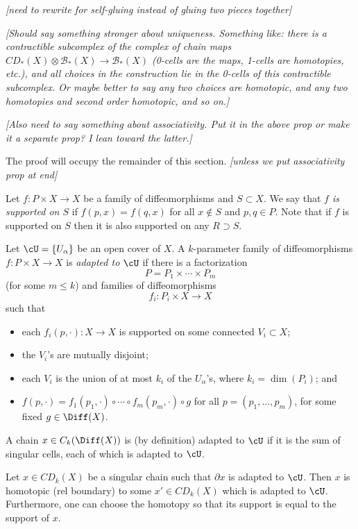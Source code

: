 \documentclass[11pt,leqno]{amsart}
\def\bc{{\mathcal B}}
\def\bd{\partial}
\def\sub{\subset}
\def\sup{\supset}
\def\nn#1{{{\it \small [#1]}}}
\newcommand{\eq}[1]{\begin{displaymath}#1\end{displaymath}}
\begin{document}
\nn{need to rewrite for self-gluing instead of gluing two pieces together}

\nn{Should say something stronger about uniqueness.
Something like: there is
a contractible subcomplex of the complex of chain maps 
$CD_*(X) \otimes \bc_*(X) \to \bc_*(X)$ (0-cells are the maps, 1-cells are homotopies, etc.),
and all choices in the construction lie in the 0-cells of this
contractible subcomplex.
Or maybe better to say any two choices are homotopic, and 
any two homotopies and second order homotopic, and so on.}

\nn{Also need to say something about associativity.
Put it in the above prop or make it a separate prop?
I lean toward the latter.}
\medskip

The proof will occupy the remainder of this section.
\nn{unless we put associativity prop at end}

\medskip

Let $f: P \times X \to X$ be a family of diffeomorphisms and $S \sub X$.
We say that {\it $f$ is supported on $S$} if $f(p, x) = f(q, x)$ for all
$x \notin S$ and $p, q \in P$.
Note that if $f$ is supported on $S$ then it is also supported on any $R \sup S$.

Let $\cU = \{U_\alpha\}$ be an open cover of $X$.
A $k$-parameter family of diffeomorphisms $f: P \times X \to X$ is
{\it adapted to $\cU$} if there is a factorization
\eq{
    P = P_1 \times \cdots \times P_m
}
(for some $m \le k$)
and families of diffeomorphisms
\eq{
    f_i :  P_i \times X \to X
}
such that
\begin{itemize}
\item each $f_i(p, \cdot): X \to X$ is supported on some connected $V_i \sub X$;
\item the $V_i$'s are mutually disjoint;
\item each $V_i$ is the union of at most $k_i$ of the $U_\alpha$'s,
where $k_i = \dim(P_i)$; and
\item $f(p, \cdot) = f_1(p_1, \cdot) \circ \cdots \circ f_m(p_m, \cdot) \circ g$
for all $p = (p_1, \ldots, p_m)$, for some fixed $g \in \Diff(X)$.
\end{itemize}
A chain $x \in C_k(\Diff(X))$ is (by definition) adapted to $\cU$ if it is the sum
of singular cells, each of which is adapted to $\cU$.

\begin{lemma}  \label{extension_lemma}
Let $x \in CD_k(X)$ be a singular chain such that $\bd x$ is adapted to $\cU$.
Then $x$ is homotopic (rel boundary) to some $x' \in CD_k(X)$ which is adapted to $\cU$.
Furthermore, one can choose the homotopy so that its support is equal to the support of $x$.
\end{lemma}
\end{document}
